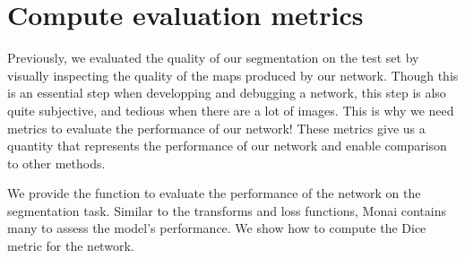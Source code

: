 \documentclass[letterpaper,10pt,english]{jupyterBook}
\begin{document}
\section{Compute evaluation metrics}
\label{\detokenize{notebooks/Tutorial3_Segmentation/Tutorial3_Segmentation_student:compute-evaluation-metrics}}
\sphinxAtStartPar
Previously, we evaluated the quality of our segmentation on the test set by visually inspecting the quality of the maps produced by our network. Though this is an essential step when developping and debugging a network, this step is also quite subjective, and tedious when there are a lot of images. This is why we need metrics to evaluate the performance of our network! These metrics give us a quantity that represents the performance of our network and enable comparison to other methods.

\sphinxAtStartPar
We provide the function  to evaluate the performance of the network on the segmentation task. Similar to the transforms and loss functions, Monai contains many  to assess the model’s performance. We show how to compute the Dice metric for the network.
\end{document}
